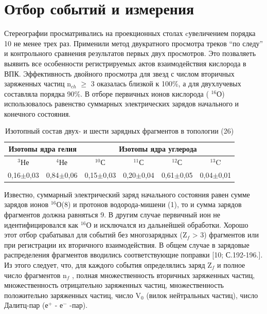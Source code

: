 \documentclass[fontsize=14pt]{scrreport}
\begin{document}
\section{Отбор событий и измерения}
\hspace{0.6cm}
Стереографии просматривались на проекционных столах cувеличением порядка 10 не менее трех раз. Применили метод двукратного просмотра треков “по следу” и контрольного сравнения результатов первых двух просмотров. Это позваляеть выявить все особенности регистрируемых актов взаимодействия кислорода в ВПК. Эффективность двойного просмотра для звезд с числом вторичных заряженных частиц n$_{ch}$ $\ge$ 3 оказалась близкой к 100\%, а для двухлучевых составляла порядка 90\%. В отборе первичных ионов кислорода ( $^{16}$О) использовалось равенство суммарных электрических зарядов начального и конечного состояния.
\begin{table}[h]
    \centering
    \begin{tabular}{|c|c|c|c|c|c|}
    \hline
        \multicolumn{2}{|c|}{Изотопы ядра гелия}&\multicolumn{4}{c|}{Изотопы ядра углерода}\\
        \hline
        $^{3}$Не&	$^{4}$Не&	$^{10}$С&	$^{11}$С&	$^{12}$С&	$^{13}$C\\
        \hline
        0,16$\pm$0,03&	0,84$\pm$0,06&	0,15$\pm$0,03&	0,20$\pm$0,04&	0,61$\pm$0,05&	0,04$\pm$0,01\\ \hline

    \end{tabular}
    \caption{Изотопный состав двух- и шести зарядных фрагментов в топологии (26)}
    \label{tab:table3}
\end{table}

Известно, суммарный электрический заряд начального состояния равен сумме зарядов ионов $^{16}$О(8) и протонов водорода-мишени (1), то и сумма зарядов фрагментов должна равняться 9. В другим случае первичный ион не идентифицировался как $^{16}$О и исключался из дальнейшей обработки. Хорошо этот отбор срабатывал для
событий без многозарядных (Z$_{f}$ > 3) фрагментов или при регистрации их вторичного взаимодействия. В общем случае в зарядовые распределения фрагментов вводились соответствующие поправки [10; С.192-196.]. Из этого следует, что, для каждого события определялись заряд Z$_{f}$ и полное число
фрагментов n$_{f}$ , полная множественность вторичных заряженных частиц, множественность отрицательно заряженных частиц, множественность положительно заряженных частиц, число V$_{0}$ (вилок
нейтральных частиц), число Далитц-пар (е$^{+}$ - е$^{-}$ -пар).
\end{document}
